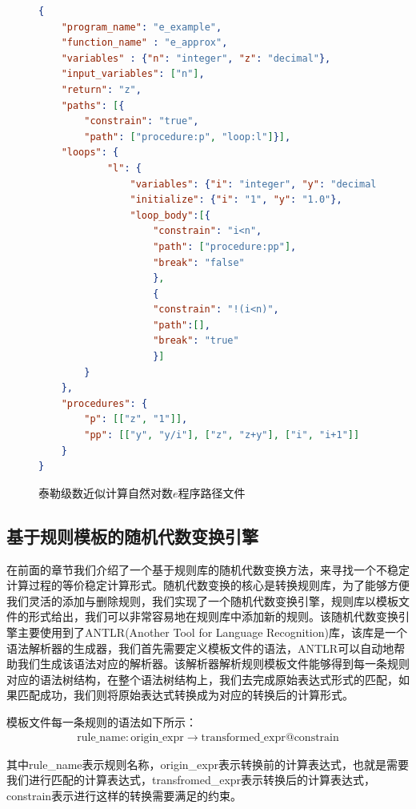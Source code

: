 \begin{figure}[thbp]
\begin{lstlisting}[language=json,firstnumber=1]
{
    "program_name": "e_example",
    "function_name" : "e_approx",
    "variables" : {"n": "integer", "z": "decimal"},
    "input_variables": ["n"],
    "return": "z",
    "paths": [{
        "constrain": "true", 
        "path": ["procedure:p", "loop:l"]}],
    "loops": {
            "l": {
                "variables": {"i": "integer", "y": "decimal"},
                "initialize": {"i": "1", "y": "1.0"},
                "loop_body":[{
                    "constrain": "i<n",
                    "path": ["procedure:pp"],
                    "break": "false"
                    },
                    {
                    "constrain": "!(i<n)",
                    "path":[],
                    "break": "true"
                    }]
        }
    },
    "procedures": {
        "p": [["z", "1"]],
        "pp": [["y", "y/i"], ["z", "z+y"], ["i", "i+1"]]
    }
}
\end{lstlisting}
\caption{泰勒级数近似计算自然对数$e$程序路径文件}
\label{lst:e_example_pathfile}
\end{figure}

\subsection{基于规则模板的随机代数变换引擎}

在前面的章节我们介绍了一个基于规则库的随机代数变换方法，来寻找一个不稳定计算过程的等价稳定计算形式。随机代数变换的核心是转换规则库，为了能够方便我们灵活的添加与删除规则，我们实现了一个随机代数变换引擎，规则库以模板文件的形式给出，我们可以非常容易地在规则库中添加新的规则。该随机代数变换引擎主要使用到了ANTLR(Another Tool for Language Recognition)库，该库是一个语法解析器的生成器，我们首先需要定义模板文件的语法，ANTLR可以自动地帮助我们生成该语法对应的解析器。该解析器解析规则模板文件能够得到每一条规则对应的语法树结构，在整个语法树结构上，我们去完成原始表达式形式的匹配，如果匹配成功，我们则将原始表达式转换成为对应的转换后的计算形式。

模板文件每一条规则的语法如下所示：
 \begin{gather*}
    \text{rule\_name} : \text{origin\_expr} \rightarrow \text{transformed\_expr} @ \text{constrain}
 \end{gather*}

 其中rule\_name表示规则名称，origin\_expr表示转换前的计算表达式，也就是需要我们进行匹配的计算表达式，transfromed\_expr表示转换后的计算表达式，constrain表示进行这样的转换需要满足的约束。

